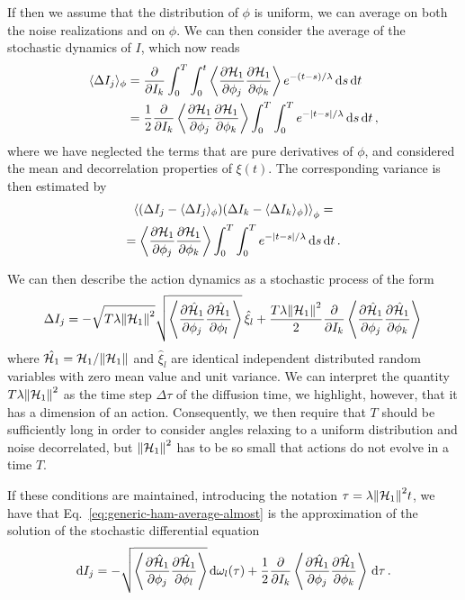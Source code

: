 If then we assume that the distribution of \(\phi\) is uniform, we can average on both the noise realizations and on $\phi$. We can then consider the average of the stochastic dynamics of \(I\), which now reads
\begin{equation}
	\begin{aligned}
		\langle\Delta I_j\rangle_\phi &= \pdv{}{I_k}\int_0^T\int_0^t \left\langle\pdv{\mathcal{H}_1}{\phi_j}\pdv{\mathcal{H}_1}{\phi_k}\right\rangle e^{-(t-s)/\lambda}\,\mathrm{d}s\,\mathrm{d}t\\
		&= \frac{1}{2}\pdv{}{I_k}\left\langle\pdv{\mathcal{H}_1}{\phi_j}\pdv{\mathcal{H}_1}{\phi_k}\right\rangle\int_0^T\int_0^T e^{-\abs{t-s}/\lambda}\,\mathrm{d}s\,\mathrm{d}t\,,
	\end{aligned}
\end{equation}
where we have neglected the terms that are pure derivatives of $\phi$, and considered the mean and decorrelation properties of \(\xi(t)\). The corresponding variance is then estimated by
\begin{multline}
	\left\langle(\Delta I_j - \langle\Delta I_j\rangle_\phi)(\Delta I_k - \langle\Delta I_k\rangle_\phi)\right\rangle_\phi =\\
	= \left\langle\pdv{\mathcal{H}_1}{\phi_j}\pdv{\mathcal{H}_1}{\phi_k}\right\rangle\int_0^T\int_0^T e^{-\abs{t-s}/\lambda}\,\mathrm{d}s\,\mathrm{d}t\,.
\end{multline}

We can then describe the action dynamics as a stochastic process of the form
\begin{equation}
	\Delta I_j = -\sqrt{T\lambda\norm{\mathcal{H}_1}^2}\sqrt{\left\langle\pdv{\hat{\mathcal{H}}_1}{\phi_j}\pdv{\hat{\mathcal{H}}_1}{\phi_l}\right\rangle}\,\hat{\xi}_l + \frac{T\lambda\norm{\mathcal{H}_1}^2}{2}\pdv{}{I_k}\left\langle\pdv{\hat{\mathcal{H}}_1}{\phi_j}\pdv{\hat{\mathcal{H}}_1}{\phi_k}\right\rangle\,
	\label{eq:generic-ham-average-almost}
\end{equation}
where \(\hat{\mathcal{H}_1}=\mathcal{H}_1/\norm{\mathcal{H}_1}\) and \(\hat{\xi}_l\) are identical independent distributed random variables with zero mean value and unit variance. We can interpret the quantity \(T\lambda\norm{\mathcal{H}_1}^2\) as the time step \(\Delta\tau\) of the diffusion time, we highlight, however, that it has a dimension of an action. Consequently, we then require that \(T\) should be sufficiently long in order to consider angles relaxing to a uniform distribution and noise decorrelated, but \(\norm{\mathcal{H}_1}^2\) has to be so small that actions do not evolve in a time \(T\). 

If these conditions are maintained, introducing the notation \(\tau = \lambda\norm{\mathcal{H}_1}^2 t\), we have that Eq.~\eqref{eq:generic-ham-average-almost} is the approximation of the solution of the stochastic differential equation
\begin{equation}
	\mathrm{d}I_j = -\sqrt{\left\langle\pdv{\hat{\mathcal{H}}_1}{\phi_j}\pdv{\hat{\mathcal{H}}_1}{\phi_l}\right\rangle}\,\mathrm{d}\omega_l(\tau) + \frac{1}{2}\pdv{}{I_k}\left\langle\pdv{\hat{\mathcal{H}}_1}{\phi_j}\pdv{\hat{\mathcal{H}}_1}{\phi_k}\right\rangle\,\mathrm{d}\tau\,.
	\label{eq:final-ham-approximation}
\end{equation}


